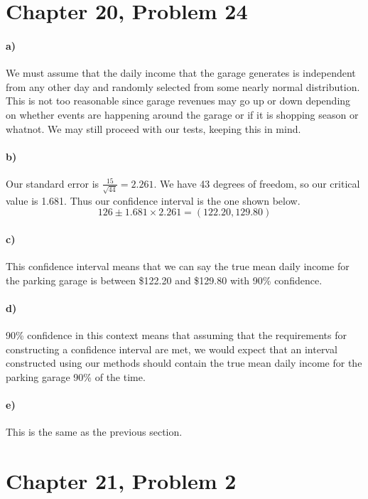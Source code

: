 \documentclass[12pt]{article}
\begin{document}
\section*{Chapter 20, Problem 24}

\paragraph{a)}

We must assume that the daily income that the garage generates is independent from any other day and randomly selected
from some nearly normal distribution. This is not too reasonable since garage revenues may go up or down depending on
whether events are happening around the garage or if it is shopping season or whatnot. We may still proceed with our tests,
keeping this in mind.

\paragraph{b)}

Our standard error is \(\frac{15}{\sqrt{44}}=2.261\). We have 43 degrees of freedom, so our critical value is 1.681. Thus
our confidence interval is the one shown below.
\[126\pm1.681\times2.261=(122.20,129.80)\]

\paragraph{c)}

This confidence interval means that we can say the true mean daily income for the parking garage is between \$122.20
and \$129.80 with 90\% confidence.

\paragraph{d)}

90\% confidence in this context means that assuming that the requirements for constructing a confidence interval are met,
we would expect that an interval constructed using our methods should contain the true mean daily income for the parking
garage 90\% of the time.

\paragraph{e)}

This is the same as the previous section.

\section*{Chapter 21, Problem 2}
\end{document}
